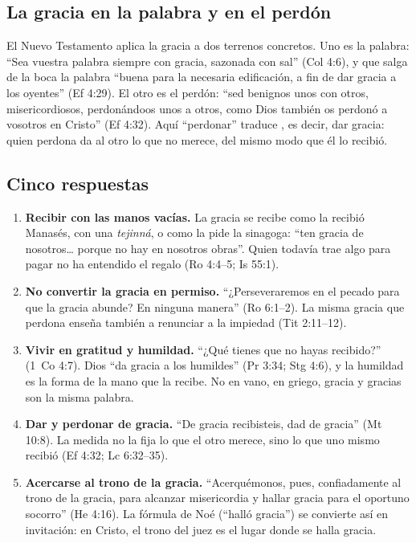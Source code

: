 \subsection{La gracia en la palabra y en el perdón}
El Nuevo Testamento aplica la gracia a dos terrenos concretos. Uno es la palabra: ``Sea vuestra palabra siempre con gracia, sazonada con sal'' (Col 4:6), y que salga de la boca la palabra ``buena para la necesaria edificación, a fin de dar gracia a los oyentes'' (Ef 4:29). El otro es el perdón: ``sed benignos unos con otros, misericordiosos, perdonándoos unos a otros, como Dios también os perdonó a vosotros en Cristo'' (Ef 4:32). Aquí ``perdonar'' traduce , es decir, dar gracia: quien perdona da al otro lo que no merece, del mismo modo que él lo recibió.

\subsection{Cinco respuestas}
\begin{enumerate}
\item \textbf{Recibir con las manos vacías.} La gracia se recibe como la recibió Manasés, con una \emph{tejinná}, o como la pide la sinagoga: ``ten gracia de nosotros\ldots{} porque no hay en nosotros obras''. Quien todavía trae algo para pagar no ha entendido el regalo (Ro 4:4--5; Is 55:1).
\item \textbf{No convertir la gracia en permiso.} ``¿Perseveraremos en el pecado para que la gracia abunde? En ninguna manera'' (Ro 6:1--2). La misma gracia que perdona enseña también a renunciar a la impiedad (Tit 2:11--12).
\item \textbf{Vivir en gratitud y humildad.} ``¿Qué tienes que no hayas recibido?'' (1~Co 4:7). Dios ``da gracia a los humildes'' (Pr 3:34; Stg 4:6), y la humildad es la forma de la mano que la recibe. No en vano, en griego, gracia y gracias son la misma palabra.
\item \textbf{Dar y perdonar de gracia.} ``De gracia recibisteis, dad de gracia'' (Mt 10:8). La medida no la fija lo que el otro merece, sino lo que uno mismo recibió (Ef 4:32; Lc 6:32--35).
\item \textbf{Acercarse al trono de la gracia.} ``Acerquémonos, pues, confiadamente al trono de la gracia, para alcanzar misericordia y hallar gracia para el oportuno socorro'' (He 4:16). La fórmula de Noé (``halló gracia'') se convierte así en invitación: en Cristo, el trono del juez es el lugar donde se halla gracia.
\end{enumerate}

